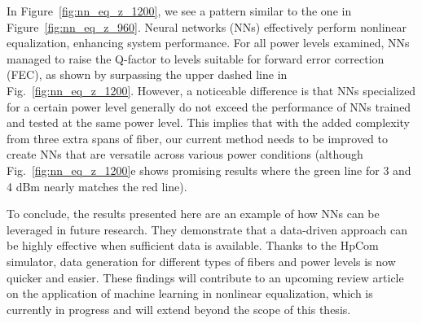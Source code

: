 


In Figure~\ref{fig:nn_eq_z_1200}, we see a pattern similar to the one in Figure~\ref{fig:nn_eq_z_960}. Neural networks (NNs) effectively perform nonlinear equalization, enhancing system performance. For all power levels examined, NNs managed to raise the Q-factor to levels suitable for forward error correction (FEC), as shown by surpassing the upper dashed line in Fig.~\ref{fig:nn_eq_z_1200}. However, a noticeable difference is that NNs specialized for a certain power level generally do not exceed the performance of NNs trained and tested at the same power level. This implies that with the added complexity from three extra spans of fiber, our current method needs to be improved to create NNs that are versatile across various power conditions (although Fig.~\ref{fig:nn_eq_z_1200}e shows promising results where the green line for 3 and 4 dBm nearly matches the red line).

To conclude, the results presented here are an example of how NNs can be leveraged in future research. They demonstrate that a data-driven approach can be highly effective when sufficient data is available. Thanks to the HpCom simulator, data generation for different types of fibers and power levels is now quicker and easier. These findings will contribute to an upcoming review article on the application of machine learning in nonlinear equalization, which is currently in progress and will extend beyond the scope of this thesis.
